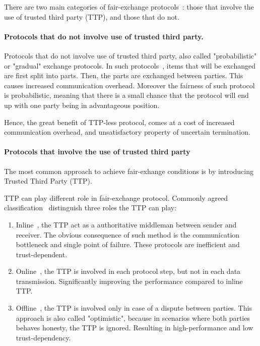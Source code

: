 \documentclass{article}
\begin{document}
There are two main categories of fair-exchange protocols~\cite{kremer2002intensive,duangphasuk2020fair}: those that involve the use of trusted third party (TTP), and those that do not.

\paragraph{Protocols that do not involve use of trusted third party.}
Protocols that do not involve use of trusted third party, also called "probabilistic" or "gradual" exchange protocols. In such protocols~\cite{markowitch1999probabilistic}, items that will be exchanged are first split into parts. Then, the parts are exchanged between parties. This causes increased communication overhead. Moreover the fairness of such protocol is probabilistic, meaning that there is a small chance that the protocol will end up with one party being in advantageous position. 

Hence, the great benefit of TTP-less protocol, comes at a cost of increased communication overhead, and unsatisfactory property of uncertain termination.


\paragraph{Protocols that involve the use of trusted third party}
The most common approach to achieve fair-exhange conditions is by introducing Trusted Third Party (TTP).  

TTP can play different role in fair-exchange protocol. Commonly agreed classification~\cite{kremer2002intensive,duangphasuk2020fair} distinguish three roles the TTP can play:

\begin{enumerate}
    \item Inline~\cite{coffey1996non}, the TTP act as a authoritative middleman between sender and receiver. The obvious consequence of such method is the communication bottleneck and single point of failure. These protocols are inefficient and trust-dependent.
    
    \item Online~\cite{djuric2015feips}, the TTP is involved in each protocol step, but not in each data transmission. Significantly improving the performance compared to inline TTP.
    
    \item Offline~\cite{hwang2015provable}, the TTP is involved only in case of a dispute between parties. This approach is also called "optimistic", because in scenarios where both parties behaves honesty, the TTP is ignored. Resulting in high-performance and low trust-dependency. 
\end{enumerate}
\end{document}
